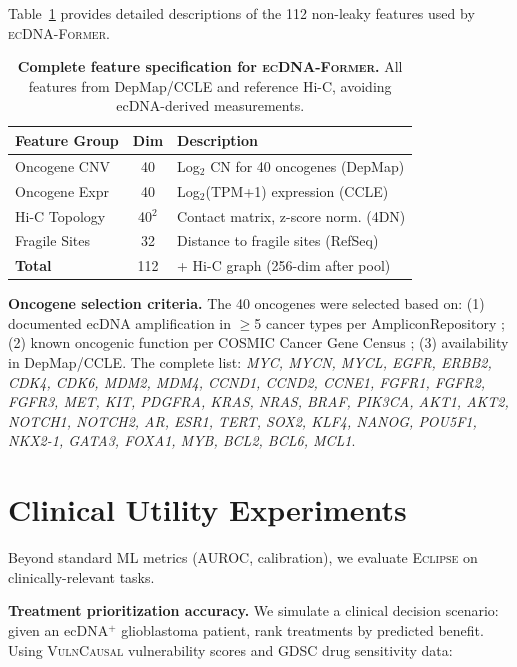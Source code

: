 \documentclass[sigconf,anonymous]{acmart}
\newcommand{\eclipse}{\textsc{Eclipse}}
\newcommand{\former}{\textsc{ecDNA-Former}}
\newcommand{\vulncausal}{\textsc{VulnCausal}}
\begin{document}
Table~\ref{tab:feature_details} provides detailed descriptions of the 112 non-leaky features used by \former{}.

\begin{table}[h]
\caption{\textbf{Complete feature specification for \former{}.} All features from DepMap/CCLE and reference Hi-C, avoiding ecDNA-derived measurements.}
\label{tab:feature_details}
\centering
\footnotesize
\begin{tabular}{@{}p{1.8cm}cp{4.2cm}@{}}
\toprule
Feature Group & Dim & Description \\
\midrule
Oncogene CNV & 40 & Log$_2$ CN for 40 oncogenes (DepMap) \\
Oncogene Expr & 40 & Log$_2$(TPM+1) expression (CCLE) \\
Hi-C Topology & 40$^2$ & Contact matrix, z-score norm. (4DN) \\
Fragile Sites & 32 & Distance to fragile sites (RefSeq) \\
\midrule
\textbf{Total} & 112 & + Hi-C graph (256-dim after pool) \\
\bottomrule
\end{tabular}
\end{table}

\textbf{Oncogene selection criteria.} The 40 oncogenes were selected based on: (1) documented ecDNA amplification in $\geq$5 cancer types per AmpliconRepository \cite{kim_2020_amplicon_repo}; (2) known oncogenic function per COSMIC Cancer Gene Census \cite{cosmic_2019}; (3) availability in DepMap/CCLE. The complete list: \textit{MYC, MYCN, MYCL, EGFR, ERBB2, CDK4, CDK6, MDM2, MDM4, CCND1, CCND2, CCNE1, FGFR1, FGFR2, FGFR3, MET, KIT, PDGFRA, KRAS, NRAS, BRAF, PIK3CA, AKT1, AKT2, NOTCH1, NOTCH2, AR, ESR1, TERT, SOX2, KLF4, NANOG, POU5F1, NKX2-1, GATA3, FOXA1, MYB, BCL2, BCL6, MCL1}.


\section{Clinical Utility Experiments}
\label{app:utility}

Beyond standard ML metrics (AUROC, calibration), we evaluate \eclipse{} on clinically-relevant tasks.

\textbf{Treatment prioritization accuracy.} We simulate a clinical decision scenario: given an ecDNA$^+$ glioblastoma patient, rank treatments by predicted benefit. Using \vulncausal{} vulnerability scores and GDSC drug sensitivity data:
\end{document}

